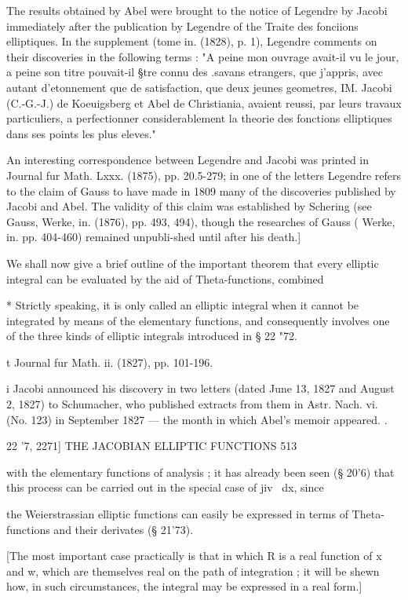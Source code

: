 The results obtained by Abel were brought to the notice of Legendre by
Jacobi immediately after the publication by Legendre of the Traite des
fonciions elliptiques. In the supplement (tome in. (1828), p. 1),
Legendre comments on their discoveries in the following terms : "A
peine mon ouvrage avait-il vu le jour, a peine son titre pouvait-il
§tre connu des .savans etrangers, que j'appris, avec autant
d'etonnement que de satisfaction, que deux jeunes geometres, IM.
Jacobi (C.-G.-J.) de Koeuigsberg et Abel de Christiania, avaient
reussi, par leurs travaux particuliers, a perfectionner
considerablement la theorie des fonctions elliptiques dans ses points
les plus eleves."

An interesting correspondence between Legendre and Jacobi was printed
in Journal fur Math. Lxxx. (1875), pp. 20.5-279; in one of the letters
Legendre refers to the claim of Gauss to have made in 1809 many of the
discoveries published by Jacobi and Abel. The validity of this claim
was established by Schering (see Gauss, Werke, in. (1876), pp. 493,
494), though the researches of Gauss ( Werke, in. pp. 404-460)
remained unpubli-shed until after his death.]

We shall now give a brief outline of the important theorem that every
elliptic integral can be evaluated by the aid of Theta-functions,
combined

* Strictly speaking, it is only called an elliptic integral when it
cannot be integrated by means of the elementary functions, and
consequently involves one of the three kinds of elliptic integrals
introduced in § 22 "72.

t Journal fur Math. ii. (1827), pp. 101-196.

i Jacobi announced his discovery in two letters (dated June 13, 1827
and August 2, 1827) to Schumacher, who published extracts from them in
Astr. Nach. vi. (No. 123) in September 1827 — the month in which
Abel's memoir appeared. .



22 '7, 2271] THE JACOBIAN ELLIPTIC FUNCTIONS 513

with the elementary functions of analysis ; it has already been seen
(§ 20'6) that this process can be carried out in the special case of
jiv~ dx, since

the Weierstrassian elliptic functions can easily be expressed in terms
of Theta-functions and their derivates (§ 21'73).

[The most important case practically is that in which R is a real
function of x and w, which are themselves real on the path of
integration ; it will be shewn how, in such circumstances, the
integral may be expressed in a real form.]

